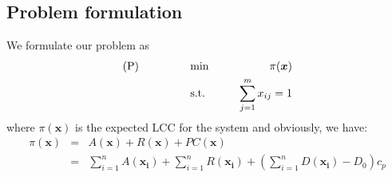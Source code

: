 \documentclass[preprint,12pt]{elsarticle}
\begin{document}
\subsection{Problem formulation}
We formulate our problem as
\begin{eqnarray}
\text{(P)} \hspace{15mm} &\text{ min }& \hspace{10mm} \pi(\boldsymbol{x}) \nonumber\\
& \text{ s.t. }&  \hspace{5mm} \sum_{j=1}^{m}{x_{ij}}=1 \nonumber
\end{eqnarray}
where $\pi(\boldsymbol{x})$ is the expected LCC for the system and obviously, we have:
\begin{eqnarray}
\pi(\boldsymbol{x}) &=& A(\boldsymbol{x})+R(\boldsymbol{x})+PC(\boldsymbol{x}) \nonumber\\
&=& \sum_{i=1}^{n}{A(\boldsymbol{x_{i}})}+\sum_{i=1}^{n}{R(\boldsymbol{x_{i}})}+(\sum_{i=1}^{n}{D(\boldsymbol{x_{i}})-D_{0}})c_{p}
\end{eqnarray}

	
   	
\end{document}
